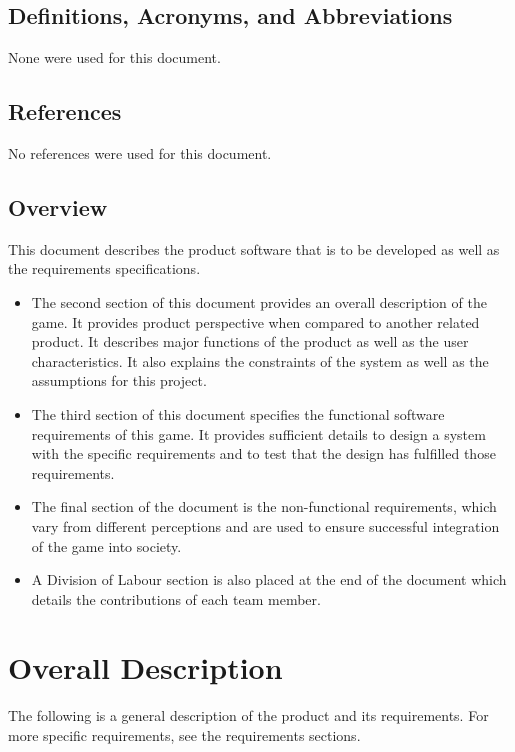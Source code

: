 \documentclass[]{article}
\begin{document}
\subsection{Definitions, Acronyms, and Abbreviations}
\label{sub:definitions_acronyms_and_abbreviations}
	None were used for this document.

\subsection{References}
\label{sub:references}
	No references were used for this document.

\subsection{Overview}
\label{sub:overview}
	This document describes the product software that is to be developed as well as the requirements specifications.
\begin{itemize}
	\item The second section of this document provides an overall description of the game. It provides product perspective when compared to another related product. It describes major functions of the product as well as the user characteristics. It also explains the constraints of the system as well as the assumptions for this project.
	\item The third section of this document specifies the functional software requirements of this game. It provides sufficient details to design a system with the specific requirements and to test that the design has fulfilled those requirements. 
	\item The final section of the document is the non-functional requirements, which vary from different perceptions and are used to ensure successful integration of the game into society.
	\item A Division of Labour section is also placed at the end of the document which details the contributions of each team member.
\end{itemize}


\section{Overall Description}
\label{sec:overall_description}

The following is a general description of the product and its requirements. For more specific requirements, see the requirements sections.
\end{document}
